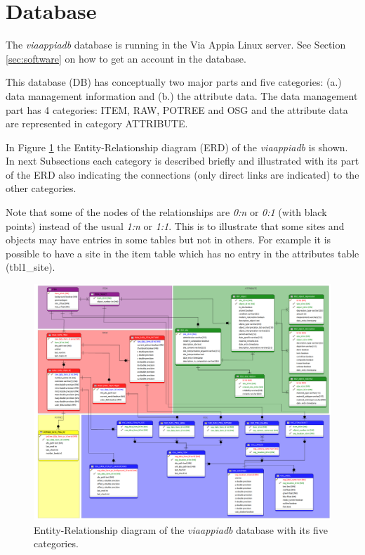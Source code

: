 \section{Database}
\label{sec:database}

The \textit{viaappiadb} database is running in the Via Appia Linux server. See Section \ref{sec:software} on how to get an account in the database.

This database (DB) has conceptually two major parts and five categories: (a.) data management information and (b.) the attribute data. The  data management part has  4 categories: ITEM, RAW, POTREE and OSG and the attribute data are represented in category ATTRIBUTE.
 
In Figure \ref{fig:db_erdb} the Entity-Relationship diagram (ERD) of the \textit{viaappiadb} is shown. In next Subsections each category is described briefly and illustrated with its part of the ERD also indicating the connections (only direct links are indicated) to the other categories. 

Note that some of the nodes of the relationships are \textit{0:n} or \textit{0:1} (with black points) instead of the usual \textit{1:n} or \textit{1:1}. This is to illustrate that some sites and objects may have entries in some tables but not in others. For example it is possible to have a site in the item table which has no entry in the attributes table (tbl1\_site).

\begin{figure}[H]
\centering
\includegraphics[scale=0.25]{fig/database/ERDB.pdf}
\caption{Entity-Relationship diagram of the \textit{viaappiadb} database with its five categories.}
\label{fig:db_erdb}
\end{figure}

